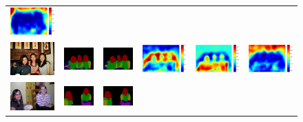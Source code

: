 \documentclass[10pt,twocolumn,letterpaper]{article}
\begin{document}
\begin{figure}
\begin{tabular}{c c c c c c}
   \includegraphics[height=0.1\linewidth]{fig/voc10_part/att3/2010_005654.pdf} \\
   \includegraphics[height=0.1\linewidth]{fig/voc10_part/img/2010_005141.jpg} &
   \includegraphics[height=0.1\linewidth]{fig/voc10_part/res_baseline/2010_005141.png} &
   \includegraphics[height=0.1\linewidth]{fig/voc10_part/res_sharenet/2010_005141.png} &
   \includegraphics[height=0.1\linewidth]{fig/voc10_part/att1/2010_005141.pdf} &
   \includegraphics[height=0.1\linewidth]{fig/voc10_part/att2/2010_005141.pdf} &
   \includegraphics[height=0.1\linewidth]{fig/voc10_part/att3/2010_005141.pdf} \\
   \includegraphics[height=0.087\linewidth]{fig/voc10_part/img/2010_004952.jpg} &
   \includegraphics[height=0.087\linewidth]{fig/voc10_part/res_baseline/2010_004952.png} &
   \includegraphics[height=0.087\linewidth]{fig/voc10_part/res_sharenet/2010_004952.png} &

\end{tabular}
\end{figure}
\end{document}
